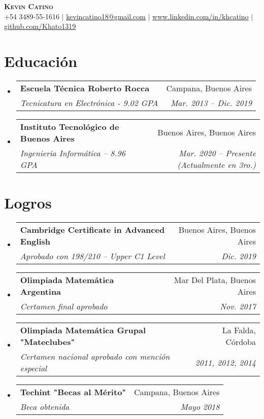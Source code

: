 \documentclass[letterpaper,11pt]{article}
\makeatletter
\newcommand{\resumeSubheading}[4]{
  \vspace{-2pt}\item
    \begin{tabular*}{0.97\textwidth}[t]{l@{\extracolsep{\fill}}r}
      \textbf{#1} & #2 \\
      \textit{\small#3} & \textit{\small #4} \\
    \end{tabular*}\vspace{-7pt}
}
\newcommand{\resumeSubHeadingListStart}{\begin{itemize}[leftmargin=0.15in, label={}]}
\newcommand{\resumeSubHeadingListEnd}{\end{itemize}}
\makeatother
\begin{document}

\begin{center}
    \textbf{\Huge \scshape Kevin Catino} \\ \vspace{1pt}
    \small +54 3489-55-1616 $|$ \href{mailto:x@x.com}{\underline{kevincatino18@gmail.com}} $|$ 
    \href{https://www.linkedin.com/in/khcatino}{\underline{www.linkedin.com/in/khcatino}} $|$
    \href{https://github.com/Khato1319}{\underline{github.com/Khato1319}}
\end{center}


\section{Educación}
  \resumeSubHeadingListStart
    \resumeSubheading
      {Escuela Técnica Roberto Rocca}{Campana, Buenos Aires}
      {Tecnicatura en Electrónica - 9.02 GPA}{Mar. 2013 -- Dic. 2019}
    \resumeSubheading
      {Instituto Tecnológico de Buenos Aires}{Buenos Aires, Buenos Aires}
      {Ingenieria Informática -- 8.96 GPA}{Mar. 2020 -- Presente (Actualmente en 3ro.)}
  \resumeSubHeadingListEnd


\section{Logros}
\resumeSubHeadingListStart
\resumeSubheading
    {Cambridge Certificate in Advanced English}{Buenos Aires, Buenos Aires}
    {Aprobado con 198/210 -- Upper C1 Level}{Dic. 2019}
  \resumeSubheading
    {Olimpiada Matemática Argentina}{Mar Del Plata, Buenos Aires}
    {Certamen final aprobado}{Nov. 2017}
    \resumeSubheading
    {Olimpiada Matemática Grupal "Mateclubes"}{La Falda, Córdoba}
    {Certamen nacional aprobado con mención especial}{2011, 2012, 2014}
  \resumeSubheading
    {Techint "Becas al Mérito"}{Campana, Buenos Aires}
    {Beca obtenida}{Mayo 2018}
\resumeSubHeadingListEnd
\end{document}
